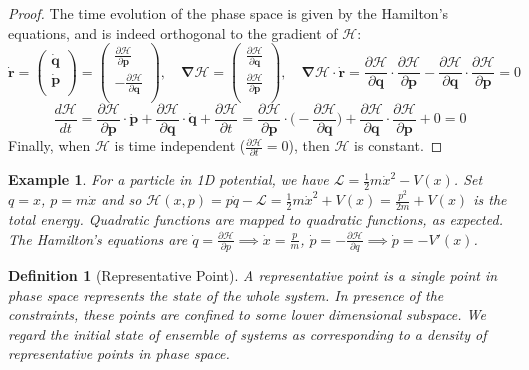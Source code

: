 \documentclass[a4paper]{article}
\newtheorem{eg}{Example}[section]
\theoremstyle{new}
\newtheorem{defi}{Definition}[section]
\begin{document}
\begin{proof}
The time evolution of the phase space is given by the Hamilton's equations, and is indeed orthogonal to the gradient of $\mathcal{H}$:
$$\mathbf{\dot{r}}=\begin{pmatrix}\dot{\mathbf{q}}\\\dot{\mathbf{p}}\\\end{pmatrix}=\begin{pmatrix}\frac{\partial\mathcal{H}}{\partial\mathbf{p}}\\-\frac{\partial\mathcal{H}}{\partial\mathbf{q}}\\\end{pmatrix},\quad\boldsymbol{\nabla}\mathcal{H}=\begin{pmatrix}\frac{\partial\mathcal{H}}{\partial\mathbf{q}}\\\frac{\partial\mathcal{H}}{\partial\mathbf{p}}\\\end{pmatrix},\quad\boldsymbol{\nabla}\mathcal{H}\cdot\mathbf{\dot{r}}=\frac{\partial\mathcal{H}}{\partial\mathbf{q}}\cdot\frac{\partial\mathcal{H}}{\partial\mathbf{p}}-\frac{\partial\mathcal{H}}{\partial\mathbf{q}}\cdot\frac{\partial\mathcal{H}}{\partial\mathbf{p}}=0$$
$$\frac{d\mathcal{H}}{dt}=\frac{\partial\mathcal{H}}{\partial\mathbf{p}}\cdot\mathbf{\dot{p}}+\frac{\partial\mathcal{H}}{\partial\mathbf{q}}\cdot\mathbf{\dot{q}}+\frac{\partial\mathcal{H}}{\partial t}=\frac{\partial\mathcal{H}}{\partial\mathbf{p}}\cdot\bigg(-\frac{\partial\mathcal{H}}{\partial\mathbf{q}}\bigg)+\frac{\partial\mathcal{H}}{\partial\mathbf{q}}\cdot\frac{\partial\mathcal{H}}{\partial\mathbf{p}}+0=0$$
Finally, when $\mathcal{H}$ is time independent ($\frac{\partial\mathcal{H}}{\partial t}=0$), then $\mathcal{H}$ is constant.
\end{proof}
\begin{eg}
For a particle in 1D potential, we have $\mathcal{L}=\frac{1}{2}m\dot{x}^2-V(x)$. Set $q=x$, $p=m\dot{x}$ and so $\mathcal{H}(x,p)=p\dot{q}-\mathcal{L}=\frac{1}{2}m\dot{x}^2+V(x)=\frac{p^2}{2m}+V(x)$ is the total energy. Quadratic functions are mapped to quadratic functions, as expected. The Hamilton's equations are $\dot{q}=\frac{\partial\mathcal{H}}{\partial p}\implies\dot{x}=\frac{p}{m}$, $\dot{p}=-\frac{\partial\mathcal{H}}{\partial q}\implies\dot{p}=-V'(x)$.
\end{eg}
\begin{defi}[Representative Point]
A representative point is a single point in phase space represents the state of the whole system. In presence of the constraints, these points are confined to some lower dimensional subspace. We regard the initial state of ensemble of systems as corresponding to a density of representative points in phase space.
\end{defi}
\end{document}
